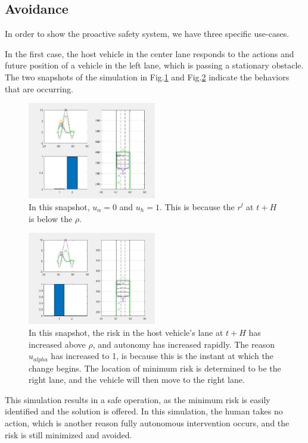 \documentclass[letterpaper, 10 pt, conference]{ieeeconf}  %
\begin{document}
 
\subsection{Avoidance}
In order to show the proactive safety system, we have three specific use-cases.

In the first case, the host vehicle in the center lane responds to the actions and future position of a vehicle in the left lane, which is passing a stationary obstacle. The two snapshots of the simulation in Fig.\ref{fig:cs1} and Fig.\ref{fig:cs1b} indicate the behaviors that are occurring.

\begin{figure}[ht]
    \includegraphics[width=0.5\textwidth]{cs1.JPG}
    \caption{In this snapshot, $u_{\alpha} = 0$ and $u_{h} = 1$. This is because the $r^l$ at $t+H$ is below the $\rho$.}
    \label{fig:cs1}
\end{figure}

\begin{figure}[ht]
    \includegraphics[width=0.5\textwidth]{cs1b.JPG}
    \caption{In this snapshot, the risk in the host vehicle's lane at $t+H$ has increased above $\rho$, and autonomy has increased rapidly. The reason $u_{alpha}$ has increased to 1, is because this is the instant at which the change begins. The location of minimum risk is determined to be the right lane, and the vehicle will then move to the right lane.}
    \label{fig:cs1b}
\end{figure}

This simulation results in a safe operation, as the minimum risk is easily identified and the solution is offered. In this simulation, the human takes no action, which is another reason fully autonomous intervention occurs, and the risk is still minimized and avoided.
\end{document}
